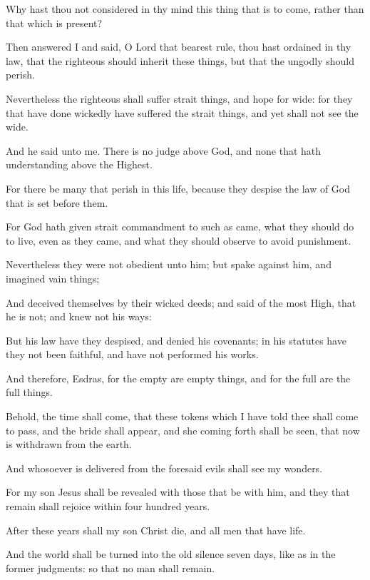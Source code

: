 {\par }{\PP {}Why hast thou not considered in thy mind this thing that is to come, rather than that which is present?
\par }{\PP {}Then answered I and said, O Lord that bearest rule, thou hast ordained in thy law, that the righteous should inherit these things, but that the ungodly should perish.
\par }{\PP {}Nevertheless the righteous shall suffer strait things, and hope for wide: for they that have done wickedly have suffered the strait things, and yet shall not see the wide.
\par }{\PP {}And he said unto me. There is no judge above God, and none that hath understanding above the Highest.
\par }{\PP {}For there be many that perish in this life, because they despise the law of God that is set before them.
\par }{\PP {}For God hath given strait commandment to such as came, what they should do to live, even as they came, and what they should observe to avoid punishment.
\par }{\PP {}Nevertheless they were not obedient unto him; but spake against him, and imagined vain things;
\par }{\PP {}And deceived themselves by their wicked deeds; and said of the most High, that he is not; and knew not his ways:
\par }{\PP {}But his law have they despised, and denied his covenants; in his statutes have they not been faithful, and have not performed his works.
\par }{\PP {}And therefore, Esdras, for the empty are empty things, and for the full are the full things.
\par }{\PP {}Behold, the time shall come, that these tokens which I have told thee shall come to pass, and the bride shall appear, and she coming forth shall be seen, that now is withdrawn from the earth.
\par }{\PP {}And whosoever is delivered from the foresaid evils shall see my wonders.
\par }{\PP {}For my son Jesus shall be revealed with those that be with him, and they that remain shall rejoice within four hundred years.
\par }{\PP {}After these years shall my son Christ die, and all men that have life.
\par }{\PP {}And the world shall be turned into the old silence seven days, like as in the former judgments: so that no man shall remain.
}
